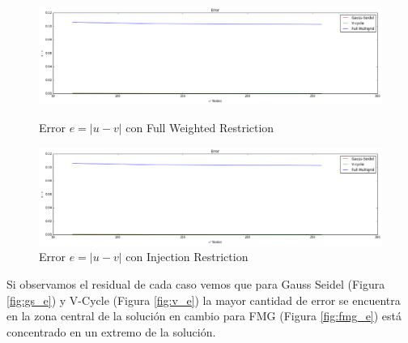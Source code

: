 \documentclass[letter, 10pt]{article}
\begin{document}
\begin{figure}[H]
    \centering
    \includegraphics[scale=0.3]{fw_e.png}
    \caption{Error $e=|u-v|$ con Full Weighted Restriction}
    \label{fig:fw_e}
    \includegraphics[scale=0.3]{injection_e.png}
    \caption{Error $e=|u-v|$ con Injection Restriction}
    \label{fig:e}
\end{figure}


Si observamos el residual de cada caso vemos que para Gauss Seidel (Figura \ref{fig:gs_e}) y V-Cycle (Figura \ref{fig:v_e}) la mayor cantidad de error se encuentra en la zona central de la solución en cambio para FMG (Figura \ref{fig:fmg_e}) está concentrado en un extremo de la solución.
\end{document}
